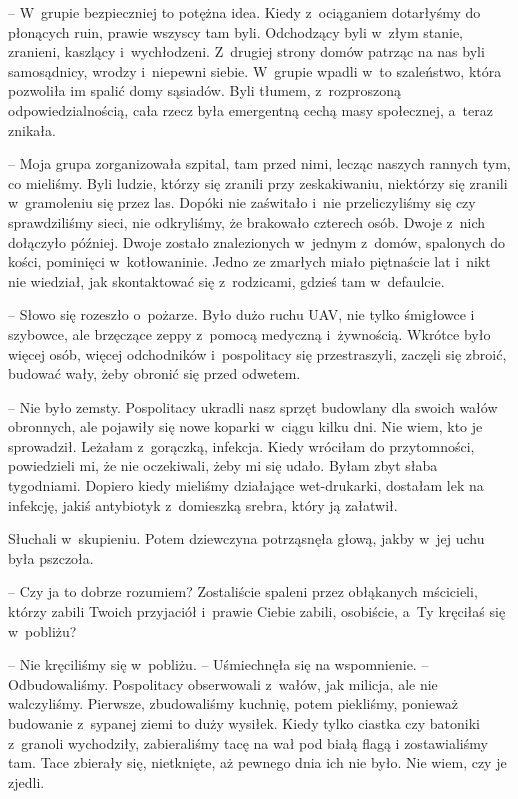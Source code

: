 \documentclass[oneside,polish,11pt,sfheadings]{mwbk}
\begin{document}
-- W~grupie bezpieczniej to potężna idea. Kiedy z~ociąganiem dotarłyśmy
do płonących ruin, prawie wszyscy tam byli. Odchodzący byli w~złym
stanie, zranieni, kaszlący i~wychłodzeni. Z~drugiej strony domów patrząc
na nas byli samosądnicy, wrodzy i~niepewni siebie. W~grupie wpadli w~to
szaleństwo, która pozwoliła im spalić domy sąsiadów. Byli tłumem, z~rozproszoną odpowiedzialnością, cała rzecz była emergentną cechą masy
społecznej, a~teraz znikała.

-- Moja grupa zorganizowała szpital, tam przed nimi, lecząc naszych
rannych tym, co mieliśmy. Byli ludzie, którzy się zranili przy
zeskakiwaniu, niektórzy się zranili w~gramoleniu się przez las. Dopóki
nie zaświtało i~nie przeliczyliśmy się czy sprawdziliśmy sieci, nie
odkryliśmy, że brakowało czterech osób. Dwoje z~nich dołączyło później.
Dwoje zostało znalezionych w~jednym z~domów, spalonych do kości,
pominięci w~kotłowaninie. Jedno ze zmarłych miało piętnaście lat i~nikt
nie wiedział, jak skontaktować się z~rodzicami, gdzieś tam w~defaulcie.

-- Słowo się rozeszło o~pożarze. Było dużo ruchu UAV, nie tylko śmigłowce
i szybowce, ale brzęczące zeppy z~pomocą medyczną i~żywnością. Wkrótce
było więcej osób, więcej odchodników i~pospolitacy się przestraszyli,
zaczęli się zbroić, budować wały, żeby obronić się przed odwetem.

-- Nie było zemsty. Pospolitacy ukradli nasz sprzęt budowlany dla swoich
wałów obronnych, ale pojawiły się nowe koparki w~ciągu kilku dni. Nie
wiem, kto je sprowadził. Leżałam z~gorączką, infekcja. Kiedy wróciłam do
przytomności, powiedzieli mi, że nie oczekiwali, żeby mi się udało.
Byłam zbyt słaba tygodniami. Dopiero kiedy mieliśmy działające
wet-drukarki, dostałam lek na infekcję, jakiś antybiotyk z~domieszką
srebra, który ją załatwił.

Słuchali w~skupieniu. Potem dziewczyna potrząsnęła głową, jakby w~jej
uchu była pszczoła. 

-- Czy ja to dobrze rozumiem? Zostaliście spaleni
przez obłąkanych mścicieli, którzy zabili Twoich przyjaciół i~prawie
Ciebie zabili, osobiście, a~Ty kręciłaś się w~pobliżu?

-- Nie kręciliśmy się w~pobliżu. -- Uśmiechnęła się na wspomnienie. -- Odbudowaliśmy. Pospolitacy obserwowali z~wałów, jak milicja, ale nie
walczyliśmy. Pierwsze, zbudowaliśmy kuchnię, potem piekliśmy, ponieważ
budowanie z~sypanej ziemi to duży wysiłek. Kiedy tylko ciastka czy
batoniki z~granoli wychodziły, zabieraliśmy tacę na wał pod białą flagą
i zostawialiśmy tam. Tace zbierały się, nietknięte, aż pewnego dnia ich
nie było. Nie wiem, czy je zjedli.
\end{document}
